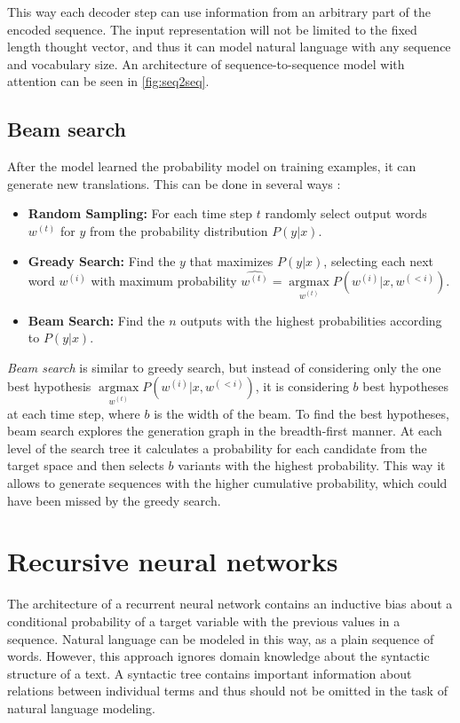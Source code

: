 This way each decoder step can use information from an arbitrary part of the encoded sequence. The input representation will not be limited to the fixed length thought vector, and thus it can model natural language with any sequence and vocabulary size. An architecture of sequence-to-sequence model with attention can be seen in \cref{fig:seq2seq}.

\subsection{Beam search} \label{beam}
After the model learned the probability model on training examples, it can generate new translations. This can be done in several ways \parencite{Neubig2017}:
        \begin{itemize}
    	\item \textbf{Random Sampling:} For each time step $t$ randomly select output words $w^{(t)}$ for $y$ from the probability distribution $P(y|x)$.
    	\item \textbf{Gready Search:} Find the $y$ that maximizes $P(y|x)$, selecting each next word $w^{(i)}$ with maximum probability $\hat{w^{(t)}} = \underset{w^{(t)}}{\operatorname{argmax}} P(w^{(i)}|x, w^{(<i)})$.
    	\item \textbf{Beam Search:} Find the $n$ outputs with the highest probabilities according to $P(y|x)$.
    \end{itemize}

\emph{Beam search} is similar to greedy search, but instead of considering only the one best hypothesis $\underset{w^{(t)}}{\operatorname{argmax}} P(w^{(i)}|x, w^{(<i)})$, it is considering $b$ best hypotheses at each time step, where $b$ is the width of the beam. To find the best hypotheses, beam search explores the generation graph in the breadth-first manner. At each level of the search tree it calculates a probability for each candidate from the target space and then selects $b$ variants with the highest probability. This way it allows to generate sequences with the higher cumulative probability, which could have been missed by the greedy search.

\section{Recursive neural networks} \label{sec:rvnn}
The architecture of a recurrent neural network contains an inductive bias about a conditional probability of a target variable with the previous values in a sequence. Natural language can be modeled in this way, as a plain sequence of words. However, this approach ignores domain knowledge about the syntactic structure of a text. A syntactic tree contains important information about relations between individual terms and thus should not be omitted in the task of natural language modeling.

